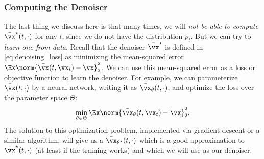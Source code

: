 \documentclass[../../book-main.tex]{subfiles}
\begin{document}
\subsubsection{Computing the Denoiser}
The last thing we discuss here is that many times, we will
\textit{not be able to compute} \(\bar{\vx}^{\star}(t, \cdot)\) for
any \(t\), since we do not have the distribution \(p_{t}\). But we
can try to \textit{learn one from data}. Recall that the denoiser
\(\bar{\vx}^{\star}\) is defined in \eqref{eq:denoising_loss} as
minimizing the mean-squared error \(\Ex\norm{\bar{\vx}(t, \vx_{t}) -
\vx}_{2}^{2}\). We can use this mean-squared error as a loss or
objective function to learn the denoiser. For example, we can
parameterize \(\bar{\vx}(t, \cdot)\) by a neural network, writing it
as \(\bar{\vx}_{\theta}(t, \cdot)\), and optimize the loss over the
parameter space \(\Theta\):
\begin{equation}
    \min_{\theta \in \Theta}\Ex\norm{\bar{\vx}_{\theta}(t, \vx_{t}) -
    \vx}_{2}^{2}.
\end{equation}
The solution to this optimization problem, implemented via gradient
descent or a similar algorithm, will give us a
\(\bar{\vx}_{\theta^{\star}}(t, \cdot)\) which is a good approximation
to \(\bar{\vx}^{\star}(t, \cdot)\) (at least if the training works)
and which we will use as our denoiser.
\end{document}
